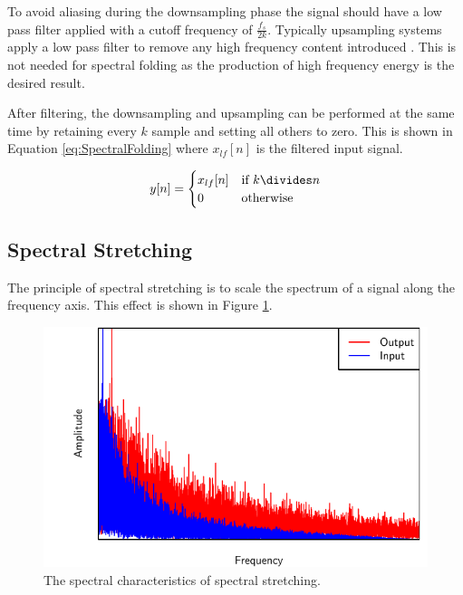 		To avoid aliasing during the downsampling phase the signal should have a low pass filter applied
		with a cutoff frequency of $\frac{f_{s}}{2k}$. Typically upsampling systems apply a low pass filter
		to remove any high frequency content introduced \citep{oppenheim2014discrete}. This is not needed for
		spectral folding as the production of high frequency energy is the desired result.

		After filtering, the downsampling and upsampling can be performed at the same time by retaining
		every $k$ sample and setting all others to zero. This is shown in Equation
		\ref{eq:SpectralFolding} where $x_{lf}[n]$ is the filtered input signal.		

		\begin{equation}
			y[n] = \begin{cases}
				x_{lf}[n] & \text{if $k \divides n$} \\
				0 & \text{otherwise}
			\end{cases}
			\label{eq:SpectralFolding}
		\end{equation}

	\subsection{Spectral Stretching}
	\label{sec:Excitation-Methods-SpectralStretching}
		The principle of spectral stretching is to scale the spectrum of a signal along the frequency axis. This
		effect is shown in Figure \ref{fig:SpectralStretching}.

		\begin{figure}[h!]
			\centering
			\includegraphics{chapter3/Images/SpectralStretchingSpectrum.pdf}
			\caption{The spectral characteristics of spectral stretching.}
			\label{fig:SpectralStretching}
		\end{figure}

